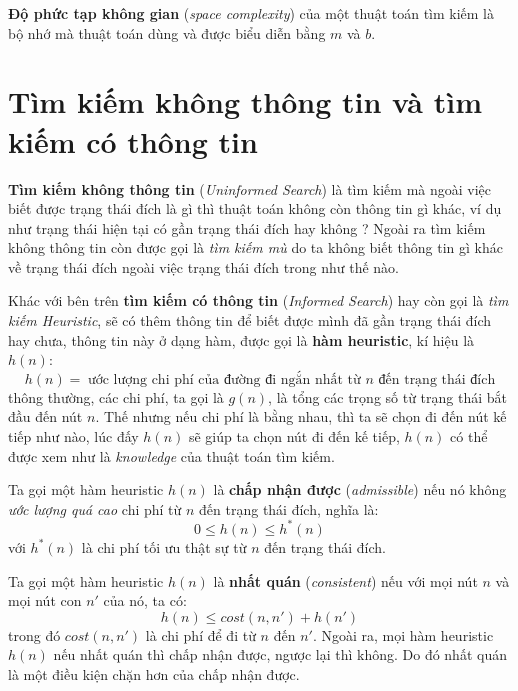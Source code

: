 \begin{defivn} \textbf{Độ phức tạp không gian} (\textit{space complexity}) của một thuật toán tìm kiếm là bộ nhớ mà thuật toán dùng và được biểu diễn bằng $m$ và $b$.
\end{defivn}

\section{Tìm kiếm không thông tin và tìm kiếm có thông tin}

\textbf{Tìm kiếm không thông tin} (\textit{Uninformed Search}) là tìm kiếm mà ngoài việc biết được trạng thái đích là gì thì thuật toán không còn thông tin gì khác, ví dụ như trạng thái hiện tại có gần trạng thái đích hay không ? Ngoài ra tìm kiếm không thông tin còn được gọi là \textit{tìm kiếm mù} do ta không biết thông tin gì khác về trạng thái đích ngoài việc trạng thái đích trong như thế nào.
\vspace{7pt}

Khác với bên trên \textbf{tìm kiếm có thông tin} (\textit{Informed Search}) hay còn gọi là \textit{tìm kiếm Heuristic}, sẽ có thêm thông tin để biết được mình đã gần trạng thái đích hay chưa, thông tin này ở dạng hàm, được gọi là \textbf{hàm heuristic}, kí hiệu là $h(n)$:
$$
h(n) = \hspace{3pt} \text{ước lượng chi phí của đường đi ngắn nhất từ $n$ đến trạng thái đích}
$$
thông thường, các chi phí, ta gọi là $g(n)$, là tổng các trọng số từ trạng thái bắt đầu đến nút $n$. Thế nhưng nếu chi phí là bằng nhau, thì ta sẽ chọn đi đến nút kế tiếp như nào, lúc đấy $h(n)$ sẽ giúp ta chọn nút đi đến kế tiếp, $h(n)$ có thể được xem như là \textit{knowledge} của thuật toán tìm kiếm.

\begin{defivn}
    Ta gọi một hàm heuristic $h(n)$ là \textbf{chấp nhận được} (\textit{admissible}) nếu nó không \textit{ước lượng quá cao} chi phí từ $n$ đến trạng thái đích, nghĩa là:
    $$
    0 \leq h(n) \leq h^*(n)
    $$
    với $h^*(n)$ là chi phí tối ưu thật sự từ $n$ đến trạng thái đích.
\end{defivn}

\begin{defivn}
    Ta gọi một hàm heuristic $h(n)$ là \textbf{nhất quán} (\textit{consistent}) nếu với mọi nút $n$ và mọi nút con $n'$ của nó, ta có:
    $$
    h(n) \leq cost(n, n') + h(n')
    $$
    trong đó $cost(n, n')$ là chi phí để đi từ $n$ đến $n'$. Ngoài ra, mọi hàm heuristic $h(n)$ nếu nhất quán thì chấp nhận được, ngược lại thì không. Do đó nhất quán là một điều kiện chặn hơn của chấp nhận được.
\end{defivn}

